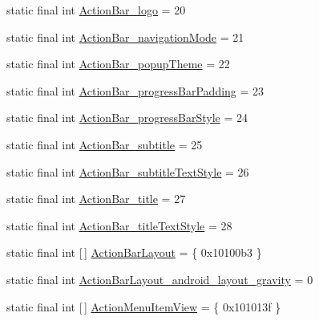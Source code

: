 \begin{DoxyCompactItemize}
\item 
static final int \mbox{\hyperlink{classandroid_1_1support_1_1design_1_1_r_1_1styleable_a86ca0f740a6f7fe3e7d8f0e3e2efc2fb}{Action\+Bar\+\_\+logo}} = 20
\item 
static final int \mbox{\hyperlink{classandroid_1_1support_1_1design_1_1_r_1_1styleable_ad8fc95cefb1d2c2d0815786770b65a1c}{Action\+Bar\+\_\+navigation\+Mode}} = 21
\item 
static final int \mbox{\hyperlink{classandroid_1_1support_1_1design_1_1_r_1_1styleable_a22c29ca0b2146dd2c86f2d13c59de6f2}{Action\+Bar\+\_\+popup\+Theme}} = 22
\item 
static final int \mbox{\hyperlink{classandroid_1_1support_1_1design_1_1_r_1_1styleable_aae1eb490ac32d9e0bbc4326a4e374325}{Action\+Bar\+\_\+progress\+Bar\+Padding}} = 23
\item 
static final int \mbox{\hyperlink{classandroid_1_1support_1_1design_1_1_r_1_1styleable_a823543c4fcadad685e4c3557843553a1}{Action\+Bar\+\_\+progress\+Bar\+Style}} = 24
\item 
static final int \mbox{\hyperlink{classandroid_1_1support_1_1design_1_1_r_1_1styleable_af38d3d211d001a3de3f41047872d1d03}{Action\+Bar\+\_\+subtitle}} = 25
\item 
static final int \mbox{\hyperlink{classandroid_1_1support_1_1design_1_1_r_1_1styleable_a61ba4d4c7ed4f102d875585fa663c19c}{Action\+Bar\+\_\+subtitle\+Text\+Style}} = 26
\item 
static final int \mbox{\hyperlink{classandroid_1_1support_1_1design_1_1_r_1_1styleable_a974d8b355e87b19ea9acfc917454fd6c}{Action\+Bar\+\_\+title}} = 27
\item 
static final int \mbox{\hyperlink{classandroid_1_1support_1_1design_1_1_r_1_1styleable_a0a7ad4430a13ba3151323314a540d21f}{Action\+Bar\+\_\+title\+Text\+Style}} = 28
\item 
static final int \mbox{[}$\,$\mbox{]} \mbox{\hyperlink{classandroid_1_1support_1_1design_1_1_r_1_1styleable_a0836ebb5f737b4f92fdf54e3c8fee963}{Action\+Bar\+Layout}} = \{ 0x10100b3 \}
\item 
static final int \mbox{\hyperlink{classandroid_1_1support_1_1design_1_1_r_1_1styleable_ab454e80c9d4eb411b2c24185392fdf3a}{Action\+Bar\+Layout\+\_\+android\+\_\+layout\+\_\+gravity}} = 0
\item 
static final int \mbox{[}$\,$\mbox{]} \mbox{\hyperlink{classandroid_1_1support_1_1design_1_1_r_1_1styleable_a8012131c7219387ea0073f47dbd32125}{Action\+Menu\+Item\+View}} = \{ 0x101013f \}
\item 

\end{DoxyCompactItemize}

